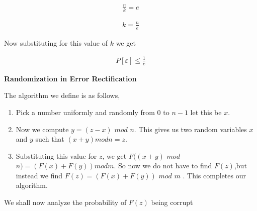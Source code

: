 \documentclass{assignment}
\begin{document}
\begin{problemlist}
\begin{problem}
\begin{answer}
\begin{eqnarray}
 \frac {n}{k} = e
\end{eqnarray}

\begin{eqnarray}
 k=\frac {n}{e} 
\end{eqnarray}

Now substituting for this value of $k$ we get 

\begin{eqnarray}
P[\varepsilon]  \leq \frac{1}{e} 
\end{eqnarray}

 
\end{answer}

\end{problem}


\pbitem

\begin{problem}

\textbf{Randomization in Error Rectification}

\begin{answer}

The algorithm we define is as follows, 

\begin{enumerate}
 \item Pick a number uniformly and randomly from $0$ to $n-1$ let this be $x$. 
\item  Now we compute $y = (z-x)$ $mod$ $n $. This gives us two random variables $x$ and $y$ such that $(x +y) mod n = z$. 
\item Substituting this value for $z$, we get $F((x+y)$ $mod$ $n)=(F(x) + F(y))mod m$. So now we do not have to find $F(z)$,but instead we find 
$F(z)=(F(x) + F(y))$ $mod$ $m$ . This completes our algorithm. 
\end{enumerate}

We shall now analyze the probability of $F(z)$ being corrupt


\end{answer}
\end{problem}
\end{problemlist}
\end{document}

